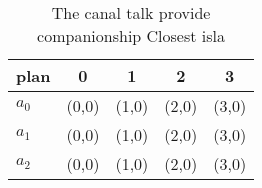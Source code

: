 \documentclass[a4paper]{article}
\begin{document}
\begin{table}
\begin{adjustbox}{width=0.5\columnwidth}
\begin{tabular}{|l|l|l|l|l|}
\hline
\textbf{plan} & \multicolumn{1}{c|}{\textbf{0}} & \multicolumn{1}{c|}{\textbf{1}} & \multicolumn{1}{c|}{\textbf{2}} & \multicolumn{1}{c|}{\textbf{3}} \\ \hline
\textbf{$a_0$}  & (0,0) & (1,0) & (2,0) & (3,0) \\ \hline
\textbf{$a_1$}  & (0,0) & (1,0) & (2,0) & (3,0) \\ \hline
\textbf{$a_2$}  & (0,0) & (1,0) & (2,0) & (3,0) \\ \hline
\end{tabular}
\end{adjustbox}
\caption{The canal talk provide companionship Closest isla
}
\end{table}
\end{document}
